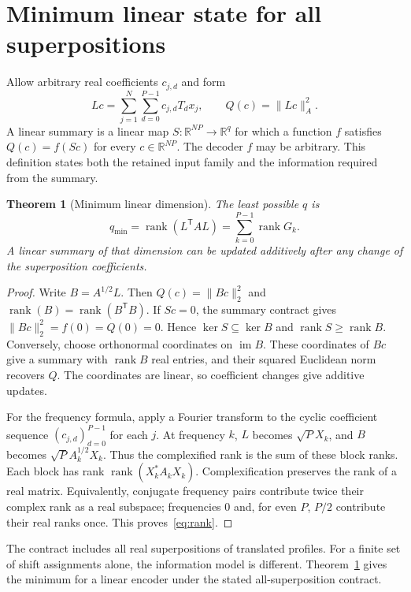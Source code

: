 \documentclass[11pt,a4paper]{article}
\newtheorem{theorem}{Theorem}\newtheorem{proposition}[theorem]{Proposition}\newtheorem{lemma}[theorem]{Lemma}\newtheorem{corollary}[theorem]{Corollary}\theoremstyle{definition}\newtheorem{definition}[theorem]{Definition}\newtheorem{example}[theorem]{Example}
\DeclareMathOperator{\rank}{rank}\DeclareMathOperator{\spanop}{span}\DeclareMathOperator{\diag}{diag}
\newcommand{\R}{\mathbb R}\newcommand{\C}{\mathbb C}\newcommand{\Z}{\mathbb Z}\newcommand{\N}{\mathbb N}\newcommand{\ip}[2]{\langle #1,#2\rangle}\newcommand{\norm}[1]{\lVert #1\rVert}\newcommand{\one}{\mathbf 1}
\begin{document}
\section{Minimum linear state for all superpositions}
Allow arbitrary real coefficients $c_{j,d}$ and form
\[
 Lc=\sum_{j=1}^N\sum_{d=0}^{P-1}c_{j,d}T_dx_j,
 \qquad Q(c)=\norm{Lc}_A^2.
\]
A linear summary is a linear map $S:\R^{NP}\to\R^q$ for which a function
$f$ satisfies $Q(c)=f(Sc)$ for every $c\in\R^{NP}$. The decoder $f$ may be
arbitrary. This definition states both the retained input family and the
information required from the summary.

\begin{theorem}[Minimum linear dimension]\label{thm:rank}
The least possible $q$ is
\begin{equation}\label{eq:rank}
 \boxed{q_{\min}=\rank(L^\mathsf T A L)
       =\sum_{k=0}^{P-1}\rank G_k.}
\end{equation}
A linear summary of that dimension can be updated additively after any
change of the superposition coefficients.
\end{theorem}
\begin{proof}
Write $B=A^{1/2}L$. Then $Q(c)=\norm{Bc}_2^2$ and
$\rank(B)=\rank(B^\mathsf T B)$.
If $Sc=0$, the summary contract gives
$\norm{Bc}_2^2=f(0)=Q(0)=0$. Hence $\ker S\subseteq\ker B$ and
$\rank S\ge\rank B$. Conversely, choose orthonormal coordinates on
$\operatorname{im}B$. These coordinates of $Bc$ give a summary with
$\rank B$ real entries, and their squared Euclidean norm recovers $Q$.
The coordinates are linear, so coefficient changes give additive updates.

For the frequency formula, apply a Fourier transform to the cyclic
coefficient sequence $(c_{j,d})_{d=0}^{P-1}$ for each $j$. At frequency $k$,
$L$ becomes $\sqrt P X_k$, and $B$ becomes
$\sqrt P A_k^{1/2}X_k$. Thus the complexified rank is the sum of these
block ranks. Each block has rank $\rank(X_k^*A_kX_k)$.
Complexification preserves the rank of a real matrix. Equivalently,
conjugate frequency pairs contribute twice their complex rank as a real
subspace; frequencies $0$ and, for even $P$, $P/2$ contribute their real
ranks once. This proves~\eqref{eq:rank}.
\end{proof}

The contract includes all real superpositions of translated profiles.
For a finite set of shift assignments alone, the information model is
different. Theorem~\ref{thm:rank} gives the minimum for a linear encoder
under the stated all-superposition contract.
\end{document}
